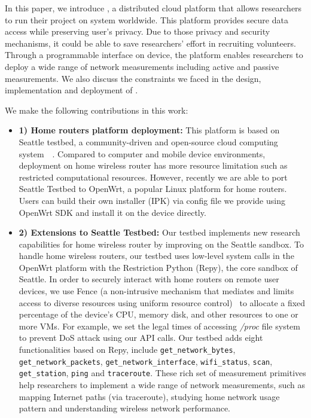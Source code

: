 In this paper, we introduce \sysname, a distributed cloud platform that allows researchers to run their project on system worldwide. This platform provides secure data access while preserving user's privacy. Due to those privacy and security mechanisms, it could be able to save researchers' effort in recruiting volunteers. Through a programmable interface on device, the platform enables researchers to deploy a wide range of network measurements including active and passive measurements. We also discuss the constraints we faced in the design, implementation and deployment of \sysname. 

We make the following contributions in this work:
{\raggedright
\begin{itemize}
\item\textbf{1) Home routers platform deployment:} This platform is based on Seattle testbed, a community-driven and open-source cloud computing system~\cite{zhuang2013experience}~\cite{cappos2009seattle}. Compared to computer and mobile device environments, deployment on home wireless router has more resource limitation such as restricted computational resources. However, recently we are able to port Seattle Testbed to OpenWrt, a popular Linux platform for home routers\cite{openwrt}. Users can build their own \sysname installer (IPK) via config file we provide using OpenWrt SDK and install it on the device directly. 

\item\textbf{2) Extensions to Seattle Testbed:}  Our testbed implements new research capabilities for home wireless router by improving on the Seattle sandbox. To handle home wireless routers, our testbed uses low-level system calls in the OpenWrt platform with the Restriction Python (Repy)\cite{cappos2010retaining}, the core sandbox of Seattle. In order to securely interact with home routers on remote user devices, we use Fence (a non-intrusive mechanism that mediates and limits access to diverse resources using uniform resource control)~\cite{li2015fence} to allocate a fixed percentage of the device's CPU, memory disk, and other resources to one or more VMs. For example, we set the legal times of accessing \emph{/proc} file system to prevent DoS attack using our API calls. Our testbed adds eight functionalities based on Repy, include \texttt{get\_network\_bytes}, \texttt{get\_network\_packets}, \texttt{get\_network\_interface}, \texttt{wifi\_status}, \texttt{scan}, \texttt{get\_station}, \texttt{ping} and \texttt{traceroute}. These rich set of measurement primitives help researchers to implement a wide range of network measurements, such as mapping Internet paths (via traceroute), studying home network usage pattern and understanding wireless network performance.


\end{itemize}}
